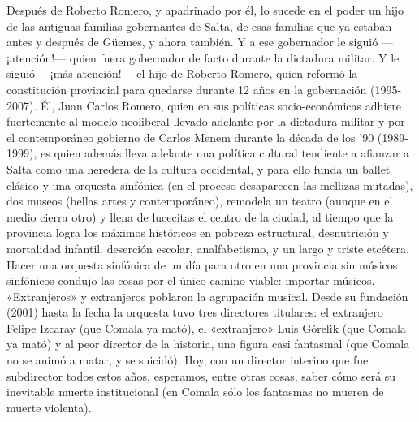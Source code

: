 Después de Roberto Romero, y apadrinado por él, lo sucede en el poder un hijo de las antiguas familias gobernantes de Salta, de esas familias que ya estaban antes y después de Güemes, y ahora también. Y a ese gobernador le siguió ---¡atención!--- quien fuera gobernador de facto durante la dictadura militar. Y le siguió ---¡más atención!--- el hijo de Roberto Romero, quien reformó la constitución provincial para quedarse durante 12 años  en la gobernación (1995-2007). Él, Juan Carlos Romero, quien en sus políticas socio-económicas adhiere fuertemente al modelo neoliberal llevado adelante por la dictadura militar y por el contemporáneo gobierno de Carlos Menem durante la década de los '90 (1989-1999), es quien además lleva adelante una política cultural tendiente a afianzar a Salta como una heredera de la cultura occidental, y para ello funda un ballet clásico y una orquesta sinfónica (en el proceso desaparecen las mellizas mutadas), dos museos (bellas artes y contemporáneo), remodela un teatro (aunque en el medio cierra otro) y llena de lucecitas el centro de la ciudad, al tiempo que la provincia logra los máximos históricos en pobreza estructural, desnutrición y mortalidad infantil, deserción escolar, analfabetismo, y un largo y triste etcétera. Hacer una orquesta sinfónica de un día para otro en una provincia sin músicos sinfónicos condujo las cosas por el único camino viable: importar músicos. «Extranjeros» y extranjeros poblaron la agrupación musical. Desde su fundación (2001) hasta la fecha la orquesta tuvo tres directores titulares: el extranjero Felipe Izcaray (que Comala ya mató), el «extranjero» Luis Górelik (que Comala ya mató) y al peor director de la historia, una figura casi fantasmal (que Comala no se animó a matar, y se suicidó). Hoy, con un director interino que fue subdirector todos estos años, esperamos, entre otras cosas, saber cómo será su inevitable muerte institucional (en Comala sólo los fantasmas no mueren de muerte violenta).

